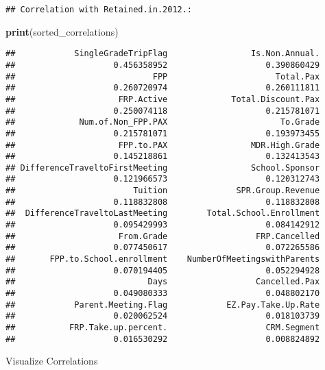 \documentclass[
]{article}
\newenvironment{Shaded}{\begin{snugshade}}{\end{snugshade}}
\newcommand{\FunctionTok}[1]{\textcolor[rgb]{0.13,0.29,0.53}{\textbf{#1}}}
\newcommand{\NormalTok}[1]{#1}
\begin{document}
\begin{verbatim}
## Correlation with Retained.in.2012.:
\end{verbatim}

\begin{Shaded}
\begin{Highlighting}[]
\FunctionTok{print}\NormalTok{(sorted\_correlations)}
\end{Highlighting}
\end{Shaded}

\begin{verbatim}
##            SingleGradeTripFlag                 Is.Non.Annual. 
##                    0.456358952                    0.390860429 
##                            FPP                      Total.Pax 
##                    0.260720974                    0.260111811 
##                     FRP.Active             Total.Discount.Pax 
##                    0.250074118                    0.215781071 
##             Num.of.Non_FPP.PAX                       To.Grade 
##                    0.215781071                    0.193973455 
##                     FPP.to.PAX                 MDR.High.Grade 
##                    0.145218861                    0.132413543 
## DifferenceTraveltoFirstMeeting                 School.Sponsor 
##                    0.121966573                    0.120312743 
##                        Tuition              SPR.Group.Revenue 
##                    0.118832808                    0.118832808 
##  DifferenceTraveltoLastMeeting        Total.School.Enrollment 
##                    0.095429993                    0.084142912 
##                     From.Grade                  FRP.Cancelled 
##                    0.077450617                    0.072265586 
##       FPP.to.School.enrollment    NumberOfMeetingswithParents 
##                    0.070194405                    0.052294928 
##                           Days                  Cancelled.Pax 
##                    0.049080333                    0.048802170 
##            Parent.Meeting.Flag            EZ.Pay.Take.Up.Rate 
##                    0.020062524                    0.018103739 
##           FRP.Take.up.percent.                    CRM.Segment 
##                    0.016530292                    0.008824892
\end{verbatim}

Visualize Correlations
\end{document}
